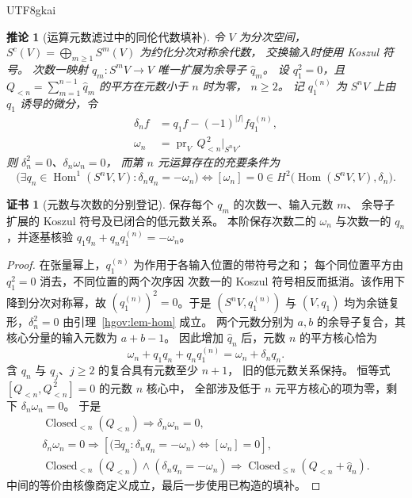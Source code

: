 \documentclass[12pt,a4paper,openany,notitlepage]{report}
\theoremstyle{plain}
\newtheorem{corollary}[theorem]{推论}
\theoremstyle{definition}
\newtheorem*{certificate}{证书}
\theoremstyle{remark}
\begin{document}
\begin{CJK*}{UTF8}{gkai}
\begin{corollary}[运算元数滤过中的同伦代数填补]
\label{hgov:cor-arity}
令 $V$ 为分次空间，$S^c(V)=\bigoplus_{m\ge1}S^m(V)$ 为约化分次对称余代数，
交换输入时使用 Koszul 符号。
次数一映射 $q_m:S^mV\to V$ 唯一扩展为余导子 $\widehat q_m$。
设 $q_1^2=0$，且
$Q_{<n}=\sum_{m=1}^{n-1}\widehat q_m$ 的平方在元数小于 $n$ 时为零，
$n\ge2$。
记 $q_1^{(n)}$ 为 $S^nV$ 上由 $q_1$ 诱导的微分，令
\[
 \begin{aligned}
 \delta_nf&=q_1f-(-1)^{|f|}f q_1^{(n)},\\
 \omega_n&=
 \operatorname{pr}_{V}\,Q_{<n}^{\,2}\big|_{S^nV}.
 \end{aligned}
\]
则 $\delta_n^2=0$、$\delta_n\omega_n=0$，
而第 $n$ 元运算存在的充要条件为
\[
 \bigl(\exists q_n\in\operatorname{Hom}^1(S^nV,V):
 \delta_nq_n=-\omega_n\bigr)
 \Longleftrightarrow
 [\omega_n]=0
 \in H^2\bigl(\operatorname{Hom}(S^nV,V),\delta_n\bigr).
\]
\end{corollary}
\begin{certificate}[元数与次数的分别登记]
保存每个 $q_m$ 的次数一、输入元数 $m$、
余导子扩展的 Koszul 符号及已闭合的低元数关系。
本阶保存次数二的 $\omega_n$ 与次数一的 $q_n$，并逐基核验
$q_1q_n+q_nq_1^{(n)}=-\omega_n$。
\end{certificate}
\begin{proof}
在张量幂上，$q_1^{(n)}$ 为作用于各输入位置的带符号之和；
每个同位置平方由 $q_1^2=0$ 消去，不同位置的两个次序因
次数一的 Koszul 符号相反而抵消。该作用下降到分次对称幂，故
$(q_1^{(n)})^2=0$。于是 $(S^nV,q_1^{(n)})$ 与 $(V,q_1)$
均为余链复形，$\delta_n^2=0$ 由引理~\ref{hgov:lem-hom} 成立。
两个元数分别为 $a,b$ 的余导子复合，其核心分量的输入元数为 $a+b-1$。
因此增加 $\widehat q_n$ 后，元数 $n$ 的平方核心恰为
\[
 \omega_n+q_1q_n+q_nq_1^{(n)}
 =\omega_n+\delta_nq_n.
\]
含 $q_n$ 与 $q_j$、$j\ge2$ 的复合具有元数至少 $n+1$，
旧的低元数关系保持。
恒等式 $[Q_{<n},Q_{<n}^{\,2}]=0$ 的元数 $n$ 核心中，
全部涉及低于 $n$ 元平方核心的项为零，剩下
$\delta_n\omega_n=0$。
于是
\[
 \begin{gathered}
 \operatorname{Closed}_{<n}(Q_{<n})
 \Longrightarrow\delta_n\omega_n=0,\\
 \delta_n\omega_n=0
 \Longrightarrow
 \left[
 \bigl(\exists q_n:\delta_nq_n=-\omega_n\bigr)
 \Longleftrightarrow[\omega_n]=0
 \right],\\
 \operatorname{Closed}_{<n}(Q_{<n})
 \wedge(\delta_nq_n=-\omega_n)
 \Longrightarrow
 \operatorname{Closed}_{\le n}(Q_{<n}+\widehat q_n).
 \end{gathered}
\]
中间的等价由核像商定义成立，最后一步使用已构造的填补。
\end{proof}



\end{CJK*}
\end{document}
